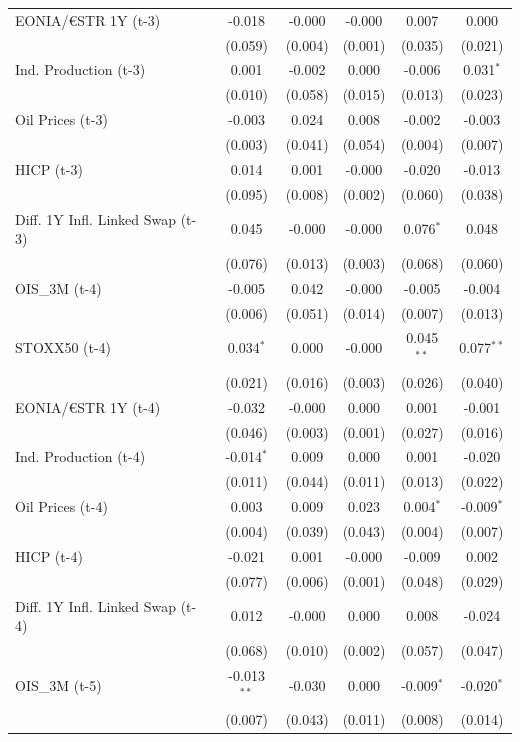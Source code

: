 \begin{longtable}[t]{lccccc}
EONIA/€STR 1Y (t-3) & -0.018 & -0.000 & -0.000 & 0.007 & 0.000\\
 & (0.059) & (0.004) & (0.001) & (0.035) & (0.021)\\
Ind. Production (t-3) & 0.001 & -0.002 & 0.000 & -0.006 & 0.031$^{*}$\\
 & (0.010) & (0.058) & (0.015) & (0.013) & (0.023)\\
Oil Prices (t-3) & -0.003 & 0.024 & 0.008 & -0.002 & -0.003\\
 & (0.003) & (0.041) & (0.054) & (0.004) & (0.007)\\
HICP (t-3) & 0.014 & 0.001 & -0.000 & -0.020 & -0.013\\
 & (0.095) & (0.008) & (0.002) & (0.060) & (0.038)\\
Diff. 1Y Infl. Linked Swap (t-3) & 0.045 & -0.000 & -0.000 & 0.076$^{*}$ & 0.048\\
 & (0.076) & (0.013) & (0.003) & (0.068) & (0.060)\\
OIS\_3M (t-4) & -0.005 & 0.042 & -0.000 & -0.005 & -0.004\\
 & (0.006) & (0.051) & (0.014) & (0.007) & (0.013)\\
STOXX50 (t-4) & 0.034$^{*}$ & 0.000 & -0.000 & 0.045$^{**}$ & 0.077$^{**}$\\
 & (0.021) & (0.016) & (0.003) & (0.026) & (0.040)\\
EONIA/€STR 1Y (t-4) & -0.032 & -0.000 & 0.000 & 0.001 & -0.001\\
 & (0.046) & (0.003) & (0.001) & (0.027) & (0.016)\\
Ind. Production (t-4) & -0.014$^{*}$ & 0.009 & 0.000 & 0.001 & -0.020\\
 & (0.011) & (0.044) & (0.011) & (0.013) & (0.022)\\
Oil Prices (t-4) & 0.003 & 0.009 & 0.023 & 0.004$^{*}$ & -0.009$^{*}$\\
 & (0.004) & (0.039) & (0.043) & (0.004) & (0.007)\\
HICP (t-4) & -0.021 & 0.001 & -0.000 & -0.009 & 0.002\\
 & (0.077) & (0.006) & (0.001) & (0.048) & (0.029)\\
Diff. 1Y Infl. Linked Swap (t-4) & 0.012 & -0.000 & 0.000 & 0.008 & -0.024\\
 & (0.068) & (0.010) & (0.002) & (0.057) & (0.047)\\
OIS\_3M (t-5) & -0.013$^{**}$ & -0.030 & 0.000 & -0.009$^{*}$ & -0.020$^{*}$\\
 & (0.007) & (0.043) & (0.011) & (0.008) & (0.014)\\

\end{longtable}
